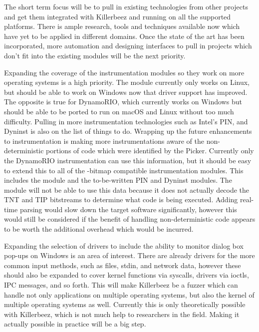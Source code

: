 The short term focus will be to pull in existing technologies from other
projects and get them integrated with Killerbeez and running on all the
supported platforms.  There is ample research, tools and techniques available
now which have yet to be applied in different domains. Once the state of the
art has been incorporated, more automation and designing interfaces to pull in
projects which don't fit into the existing modules will be the next priority.

Expanding the coverage of the instrumentation modules so they work on more
operating systems is a high priority. The \IPT{} module currently only works
on Linux, but should be able to work on Windows now that driver support has
improved. The opposite is true for DynamoRIO, which currently works on Windows
but should be able to be ported to run on macOS and Linux without too much
difficulty.  Pulling in more instrumentation technologies such as Intel's PIN,
and Dyninst\cite{dyninst} is also on the list of things to do. Wrapping up the
future enhancements to instrumentation is making more instrumentations aware of
the non-deterministic portions of code which were identified by the Picker.
Currently only the DynamoRIO instrumentation can use this information, but
it should be easy to extend this to all of the \AFL{}-bitmap compatible
instrumentation modules.  This includes the \AFL{} module and the to-be-written
PIN and Dyninst modules.  The \IPT{} module will not be able to use this data
because it does not actually decode the TNT and TIP bitstreams to determine what
code is being executed. Adding real-time parsing would slow down the target
software significantly, however this would still be considered if the benefit
of handling non-deterministic code appears to be worth the additional overhead
which would be incurred.

Expanding the selection of drivers to include the ability to monitor dialog
box pop-ups on Windows is an area of interest. There are already drivers for
the more common input methods, such as files, stdin, and network data, however
these should also be expanded to cover kernel functions via syscalls, drivers
via ioctls, IPC messages, and so forth. This will make Killerbeez be a fuzzer
which can handle not only applications on multiple operating systems, but also
the kernel of multiple operating systems as well.  Currently this is only
theoretically possible with Killerbeez, which is not much help to researchers
in the field. Making it actually possible in practice will be a big step.

